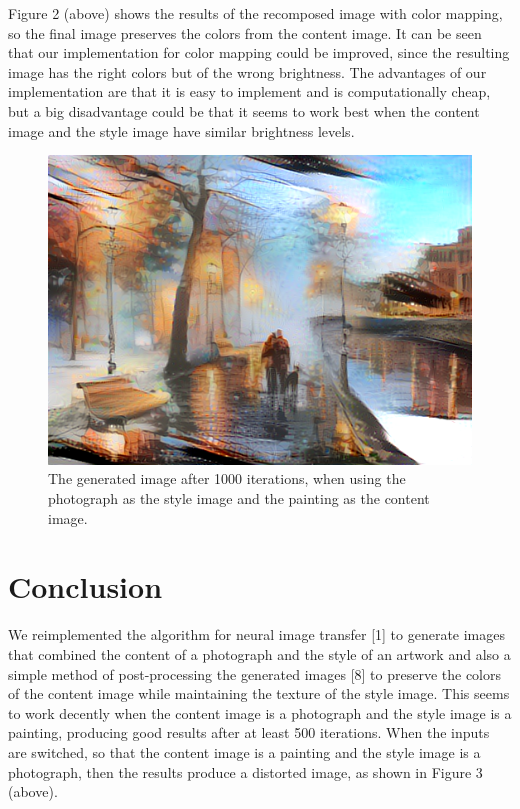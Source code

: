 \documentclass[10pt,twocolumn,letterpaper]{article}
\begin{document}
Figure 2 (above) shows the results of the recomposed image with color mapping, so the final image preserves the colors from the content image. It can be seen that our implementation for color mapping could be improved, since the resulting image has the right colors but of the wrong brightness. The advantages of our implementation are that it is easy to implement and is computationally cheap, but a big disadvantage could be that it seems to work best when the content image and the style image have similar brightness levels.

\begin{figure}[t]
\begin{center}
\includegraphics[width=0.8\linewidth]{brooklyn_night/out.png}
\end{center}
   \caption{The generated image after 1000 iterations, when using the photograph as the style image and the painting as the content image.}
\label{fig:long}
\label{fig:onecol}
\end{figure}

\section{Conclusion}

We reimplemented the algorithm for neural image transfer [1] to generate images that combined the content of a photograph and the style of an artwork and also a simple method of post-processing the generated images [8] to preserve the colors of the content image while maintaining the texture of the style image. This seems to work decently when the content image is a photograph and the style image is a painting, producing good results after at least 500 iterations. When the inputs are switched, so that the content image is a painting and the style image is a photograph, then the results produce a distorted image, as shown in Figure 3 (above).
\end{document}
